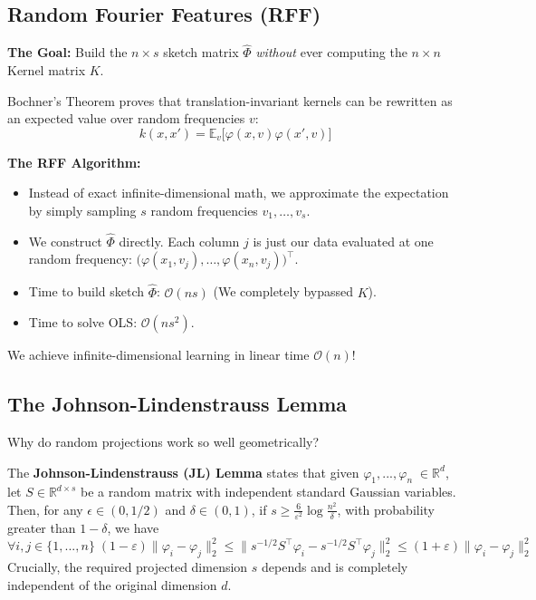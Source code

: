 \documentclass[
11pt,notheorems,hyperref={pdfauthor=whatever}
]{beamer}
\begin{document}
\subsection{Random Fourier Features (RFF)}
\begin{frame}
    \alert{\textbf{The Goal:}} Build the \(n \times s\) sketch matrix \(\hat{\Phi}\) \textit{without} ever computing the \(n \times n\) Kernel matrix \(K\).

    \vspace{0.2cm}
     Bochner's Theorem proves that translation-invariant kernels can be rewritten as an expected value over random frequencies \(v\):
    \[
        k(x, x') = \mathbb{E}_v \big[ \varphi(x, v)\varphi(x', v) \big]
    \]

    \vspace{0.2cm}
    \textbf{The RFF Algorithm:}
    \begin{itemize}
        \item Instead of exact infinite-dimensional math, we approximate the expectation by simply sampling \(s\) random frequencies \(v_1, \dots, v_s\).
        \item We construct \(\hat{\Phi}\) directly. Each column \(j\) is just our data evaluated at one random frequency: \(\big(\varphi(x_1, v_j), \dots, \varphi(x_n, v_j)\big)^\top\).
    \end{itemize}

    \vspace{0.2cm}
    \begin{itemize}
        \item Time to build sketch \(\hat{\Phi}\): \textbf{\(\mathcal{O}(ns)\)} (We completely bypassed \(K\)).
        \item Time to solve OLS: \textbf{\(\mathcal{O}(ns^2)\)}.
    \end{itemize}
    We achieve infinite-dimensional learning in linear time \(\mathcal{O}(n)\)!
\end{frame}

\subsection{The Johnson-Lindenstrauss Lemma}
\begin{frame}
    Why do random projections work so well geometrically? 
    
    The \alert{\textbf{Johnson-Lindenstrauss (JL) Lemma}} states that given \(\varphi_1,...,\varphi_n\;\in \mathbb{R}^d\), let \(S \in \mathbb{R}^{d \times s}\) be a random matrix with independent standard Gaussian variables. Then, for any \(\epsilon \in (0, 1/2)\) and \(\delta \in (0, 1)\), if \(s \ge \frac{6}{\varepsilon^2} \log \frac{n^2}{\delta}\), with probability greater than \(1-\delta\), we have
    \[
        \forall i,j \in \{1,...,n\}\;(1-\varepsilon)\|\varphi_i - \varphi_j\|_2^2 \le \|s^{-1/2}S^\top \varphi_i - s^{-1/2}S^\top \varphi_j\|_2^2 \le (1+\varepsilon)\|\varphi_i - \varphi_j\|_2^2
    \]
    Crucially, the required projected dimension \(s\) depends  and is completely independent of the original dimension \(d\).
\end{frame}
\end{document}
